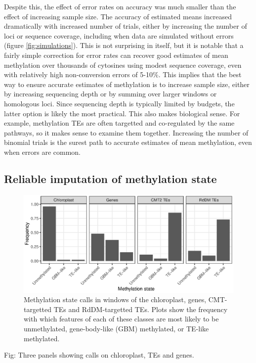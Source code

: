 \documentclass[12pt,longbibliography]{article}
\begin{document}
Despite this, the effect of error rates on accuracy was much smaller than the effect of increasing sample size.
The accuracy of estimated means increased dramatically with increased number of trials, either by increasing the number of loci or sequence coverage, including when data are simulated without errors (figure \ref{fig:simulations}).
This is not surprising in itself, but it is notable that a fairly simple correction for error rates can recover good estimates of mean methylation over thousands of cytosines using modest sequence coverage, even with relatively high non-conversion errors of 5-10\%.
This implies that the best way to ensure accurate estimates of methylation is to increase sample size, either by increasing sequencing depth or by summing over larger windows or homologous loci.
Since sequencing depth is typically limited by budgets, the latter option is likely the most practical.
This also makes biological sense.
For example, methylation TEs are often targetted and co-regulated by the same pathways, so it makes sense to examine them together.
Increasing the number of binomial trials is the surest path to accurate estimates of mean methylation, even when errors are common.

\subsection{Reliable imputation of methylation state}

\begin{figure}
    \centering
    \includegraphics{figure4.eps}
    \caption{
        Methylation state calls in windows of the chloroplast, genes, CMT-targetted TEs and RdDM-targetted TEs.
        Plots show the frequency with which features of each of these classes are most likely to be unmethylated, gene-body-like (GBM) methylated, or TE-like methylated.
    }
    \label{fig:meth-state}
\end{figure}
Fig: Three panels showing calls on chloroplast, TEs and genes.
\end{document}
